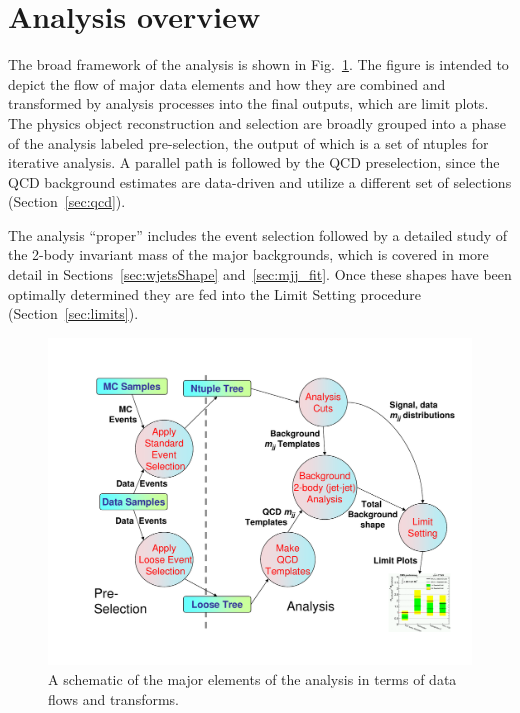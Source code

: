 \section{Analysis overview}
\label{sec:overview}

The broad framework of the analysis is shown in Fig.~\ref{fig:dfdlevel0}.
The figure is intended to depict the flow of major data elements and
how they are combined and transformed by analysis processes into the
final outputs, which are limit plots. The physics object reconstruction
and selection are broadly grouped into a phase of the analysis labeled
pre-selection, the output of which is a set of ntuples for iterative analysis.
A parallel path is followed by the QCD preselection, since the QCD
background estimates are data-driven and utilize a different set of
selections (Section~\ref{sec:qcd}).

The analysis ``proper'' includes the event selection followed by a
detailed study of the 2-body invariant mass of the major backgrounds,
which is covered in more detail in Sections~\ref{sec:wjetsShape}
and~\ref{sec:mjj_fit}. Once these shapes have been optimally determined
they are fed into the Limit Setting procedure (Section~\ref{sec:limits}).

\begin{figure}[bthp]
\begin{center}
\includegraphics[width=\textwidth]{figs/mjjdfd0.pdf}
\caption{\label{fig:dfdlevel0}A schematic of the major elements of
the analysis in terms of data flows and transforms.}
\end{center}
\end{figure}
